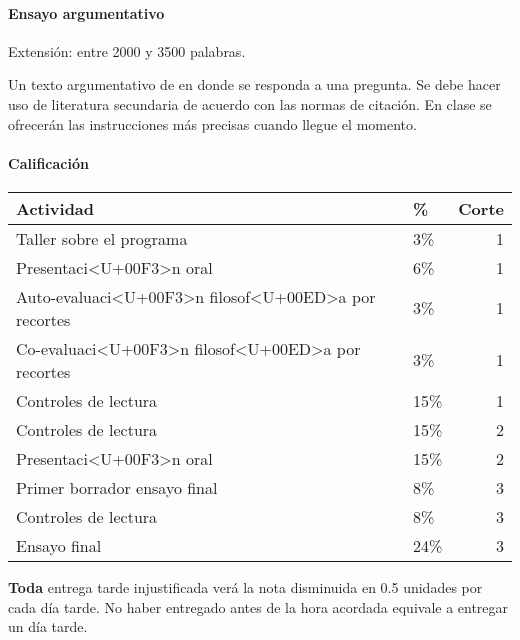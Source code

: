 \documentclass[spanish,]{article}
\let\oldparagraph\paragraph
\renewcommand{\paragraph}[1]{\oldparagraph{#1}\mbox{}}
\begin{document}
\paragraph{\texorpdfstring{\textbf{Ensayo
argumentativo}}{Ensayo argumentativo}}\label{ensayo-argumentativo}

Extensión: entre 2000 y 3500 palabras.

Un texto argumentativo de en donde se responda a una pregunta. Se debe
hacer uso de literatura secundaria de acuerdo con las normas de
citación. En clase se ofrecerán las instrucciones más precisas cuando
llegue el momento.

\paragraph{\texorpdfstring{\textbf{Calificación}}{Calificación}}\label{calificacion}

\begin{tabular}{l|l|r}
\hline
Actividad & \% & Corte\\
\hline
Taller sobre el programa & 3\% & 1\\
\hline
Presentaci<U+00F3>n oral & 6\% & 1\\
\hline
Auto-evaluaci<U+00F3>n filosof<U+00ED>a por recortes & 3\% & 1\\
\hline
Co-evaluaci<U+00F3>n filosof<U+00ED>a por recortes & 3\% & 1\\
\hline
Controles de lectura & 15\% & 1\\
\hline
Controles de lectura & 15\% & 2\\
\hline
Presentaci<U+00F3>n oral & 15\% & 2\\
\hline
Primer borrador ensayo final & 8\% & 3\\
\hline
Controles de lectura & 8\% & 3\\
\hline
Ensayo final & 24\% & 3\\
\hline
\end{tabular}

\textbf{Toda} entrega tarde injustificada verá la nota disminuida en 0.5
unidades por cada día tarde. No haber entregado antes de la hora
acordada equivale a entregar un día tarde.
\end{document}
